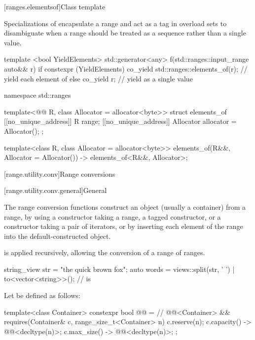 [ranges.elementsof]{Class template }

Specializations of  encapsulate a range and
act as a tag in overload sets to disambiguate
when a range should be treated as a sequence
rather than a single value.

\begin{example}
\begin{codeblock}
template <bool YieldElements>
std::generator<any> f(std::ranges::input_range auto&& r) {
  if constexpr (YieldElements)
    co_yield std::ranges::elements_of(r);       // yield each element of 
  else
    co_yield r;                                 // yield  as a single value
}
\end{codeblock}
\end{example}

\begin{codeblock}
namespace std::ranges {
  template<@@ R, class Allocator = allocator<byte>>
  struct elements_of {
    [[no_unique_address]] R range;
    [[no_unique_address]] Allocator allocator = Allocator();
  };

  template<class R, class Allocator = allocator<byte>>
    elements_of(R&&, Allocator = Allocator()) -> elements_of<R&&, Allocator>;
}
\end{codeblock}

[range.utility.conv]{Range conversions}

[range.utility.conv.general]{General}

\pnum
The range conversion functions construct
an object (usually a container) from a range,
by using a constructor taking a range,
a  tagged constructor, or
a constructor taking a pair of iterators, or
by inserting each element of the range into the default-constructed object.

\pnum
{} is applied recursively,
allowing the conversion of a range of ranges.

\begin{example}
\begin{codeblock}
string_view str = "the quick brown fox";
auto words = views::split(str, ' ') | to<vector<string>>();
//  is 
\end{codeblock}
\end{example}

\pnum
Let  be defined as follows:
\begin{codeblock}
template<class Container>
constexpr bool @@ =          // \expos
  @@<Container> &&
  requires(Container& c, range_size_t<Container> n) {
    c.reserve(n);
    { c.capacity() } -> @@<decltype(n)>;
    { c.max_size() } -> @@<decltype(n)>;
  };
\end{codeblock}

